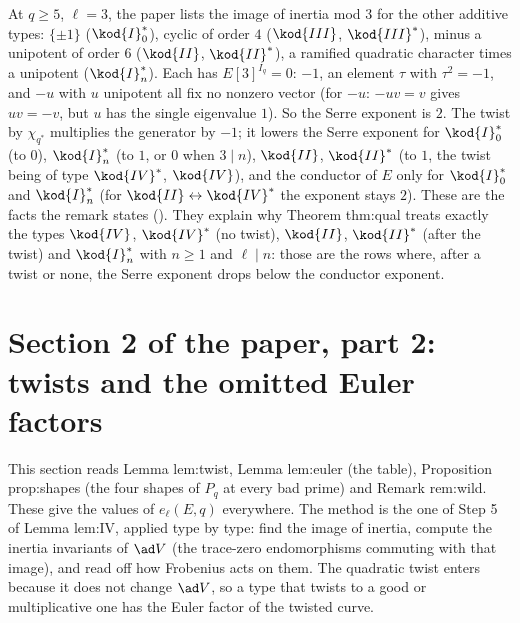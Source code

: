 \begin{sloppypar}
\begin{remark}\label{rem:paper:types}
At $q\ge5$, $\ell=3$, the paper lists the image of inertia mod $3$ for the other additive types: $\{\pm1\}$ ($\kod{I}_0^*$), cyclic of order $4$ ($\kod{III}$, $\kod{III}^*$), minus a
unipotent of order $6$ ($\kod{II}$, $\kod{II}^*$), a ramified quadratic character times a unipotent ($\kod{I}_n^*$). Each has $E[3]^{I_q}=0$: $-1$, an element $\tau$ with $\tau^2=-1$,
and $-u$ with $u$ unipotent all fix no nonzero vector (for $-u$: $-uv=v$ gives $uv=-v$, but $u$ has the single eigenvalue $1$). So the Serre exponent is $2$. The twist by
$\chi_{q^*}$ multiplies the generator by $-1$; it lowers the Serre exponent for $\kod{I}_0^*$ (to $0$), $\kod{I}_n^*$ (to $1$, or $0$ when $3\mid n$), $\kod{II}$, $\kod{II}^*$ (to $1$, the twist
being of type $\kod{IV}^*$, $\kod{IV}$), and the conductor of $E$ only for $\kod{I}_0^*$ and $\kod{I}_n^*$ (for $\kod{II}\leftrightarrow\kod{IV}^*$ the exponent stays $2$). These are the facts the
remark states (). They explain why Theorem thm:qual treats exactly the types $\kod{IV}$, $\kod{IV}^*$ (no twist), $\kod{II}$, $\kod{II}^*$ (after the
twist) and $\kod{I}_n^*$ with $n\ge1$ and $\ell\mid n$: those are the rows where, after a twist or none, the Serre exponent drops below the conductor exponent.
\end{remark}

\section[Paper 2: twists and Euler factors]{Section 2 of the paper, part 2: twists and the omitted Euler factors}\label{sec:paper:twists-euler}

This section reads Lemma lem:twist, Lemma lem:euler (the table), Proposition prop:shapes (the four shapes of $P_q$ at every bad prime) and Remark
rem:wild. These give the values of $e_\ell(E,q)$ everywhere. The method is the one of Step 5 of Lemma lem:IV, applied type by type: find the image of inertia, compute the
inertia invariants of $\ad V$ (the trace-zero endomorphisms commuting with that image), and read off how Frobenius acts on them. The quadratic twist enters because it does
not change $\ad V$, so a type that twists to a good or multiplicative one has the Euler factor of the twisted curve.


\end{sloppypar}
